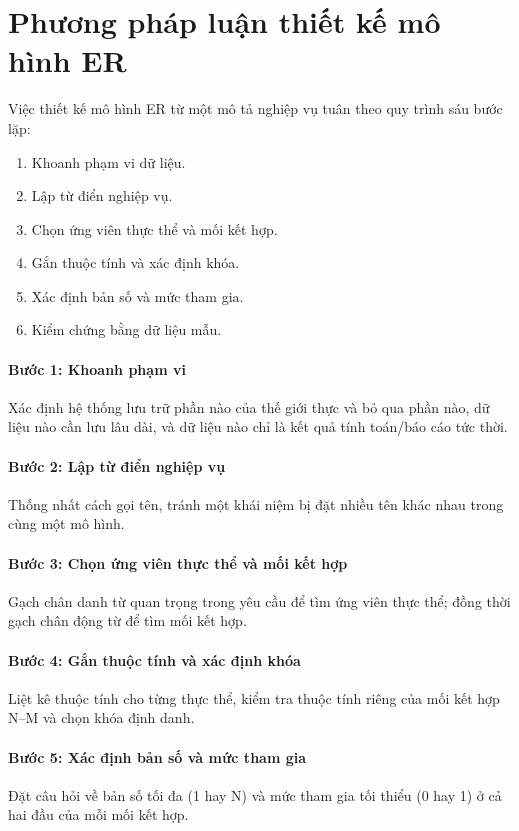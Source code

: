 \section{Phương pháp luận thiết kế mô hình ER}
\label{sec:phuongphapluan}

Việc thiết kế mô hình ER từ một mô tả nghiệp vụ tuân theo quy trình sáu bước lặp:
\begin{enumerate}
    \item Khoanh phạm vi dữ liệu.
    \item Lập từ điển nghiệp vụ.
    \item Chọn ứng viên thực thể và mối kết hợp.
    \item Gắn thuộc tính và xác định khóa.
    \item Xác định bản số và mức tham gia.
    \item Kiểm chứng bằng dữ liệu mẫu.
\end{enumerate}

\paragraph{Bước 1: Khoanh phạm vi}
Xác định hệ thống lưu trữ phần nào của thế giới thực và bỏ qua phần nào, dữ liệu nào cần lưu lâu dài, và dữ liệu nào chỉ là kết quả tính toán/báo cáo tức thời.

\paragraph{Bước 2: Lập từ điển nghiệp vụ}
Thống nhất cách gọi tên, tránh một khái niệm bị đặt nhiều tên khác nhau trong cùng một mô hình.

\paragraph{Bước 3: Chọn ứng viên thực thể và mối kết hợp}
Gạch chân danh từ quan trọng trong yêu cầu để tìm ứng viên thực thể; đồng thời gạch chân động từ để tìm mối kết hợp.

\paragraph{Bước 4: Gắn thuộc tính và xác định khóa}
Liệt kê thuộc tính cho từng thực thể, kiểm tra thuộc tính riêng của mối kết hợp N--M và chọn khóa định danh.

\paragraph{Bước 5: Xác định bản số và mức tham gia}
Đặt câu hỏi về bản số tối đa (1 hay N) và mức tham gia tối thiểu (0 hay 1) ở cả hai đầu của mỗi mối kết hợp.

